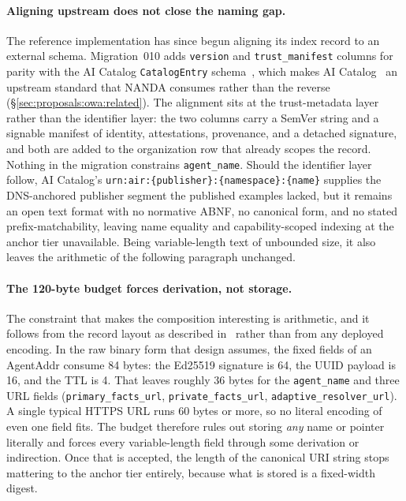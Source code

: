 \paragraph{Aligning upstream does not close the naming gap.}
The reference implementation has since begun aligning its
index record to an external schema. Migration~010 adds
\texttt{version} and \texttt{trust\_manifest} columns for
parity with the AI Catalog \texttt{CatalogEntry}
schema~\cite{nanda_index_impl}, which makes AI
Catalog~\cite{ai_catalog} an upstream standard that NANDA
consumes rather than the reverse
(\S\ref{sec:proposals:owa:related}). The alignment sits at
the trust-metadata layer rather than the identifier layer:
the two columns carry a SemVer string and a signable
manifest of identity, attestations, provenance, and a
detached signature, and both are added to the organization
row that already scopes the record. Nothing in the
migration constrains \texttt{agent\_name}. Should the
identifier layer follow, AI Catalog's
\texttt{urn:air:\{publisher\}:\{namespace\}:\{name\}}
supplies the DNS-anchored publisher segment the published
examples lacked, but it remains an open text format with
no normative ABNF, no canonical form, and no stated
prefix-matchability, leaving name equality and
capability-scoped indexing at the anchor tier unavailable.
Being variable-length text of unbounded size, it also
leaves the arithmetic of the following paragraph
unchanged.

\paragraph{The 120-byte budget forces derivation, not storage.}
The constraint that makes the composition interesting is
arithmetic, and it follows from the record layout as
described in~\cite{nanda_index} rather than from any
deployed encoding. In the raw binary form that design
assumes, the fixed fields of an AgentAddr consume 84
bytes: the Ed25519 signature is 64, the UUID payload is
16, and the TTL is 4. That leaves
roughly 36 bytes for the \texttt{agent\_name} and three
URL fields (\texttt{primary\_facts\_url},
\texttt{private\_facts\_url},
\texttt{adaptive\_resolver\_url}). A single typical HTTPS
URL runs 60 bytes or more, so no literal encoding of even
one field fits. The budget therefore rules out storing
\emph{any} name or pointer literally and forces every
variable-length field through some derivation or
indirection. Once that is accepted, the length of the
canonical URI string stops mattering to the anchor tier
entirely, because what is stored is a fixed-width digest.

